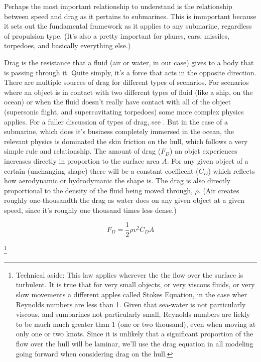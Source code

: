 \documentclass{article}\usepackage[]{graphicx}\usepackage[]{color}
\begin{document}
Perhaps the most important relationship to understand is the relationship between speed and drag as it pertains to submarines.  This is immportant because it sets out the fundamental framework as it applies to any submarine, regardless of propulsion type.  (It's also a pretty important for planes, cars, missiles, torpedoes, and basically everything else.)

Drag is the resistance that a fluid (air or water, in our case) gives to a body that is passing through it. Quite simply, it's a force that acts in the opposite direction.  There are multiple sources of drag for different types of scenarios.  For scenarios where an object is in contact with two different types of fluid (like a ship, on the ocean) or when the fluid doesn't really have contact with all of the object (supersonic flight, and supercavitating torpedoes) some more complex physics applies. For a fuller discussion of types of drag, see \parencite{carlton2007}. But in the case of a submarine, which does it's business completely immersed in the ocean, the relevant physics is dominated the skin friction on the hull, which follows a very simple rule and relationship.  The amount of drag ($F_D$) an objet experiences increases directly in proportion to the surface area $A$.  For any given object of a certain (unchanging shape) there will be a constant coefficent ($C_D$) which reflects how aerodynamic or hydrodymanic the shape is.  The drag is also directly proportional to the density of the fluid being moved through, $\rho$.  (Air creates roughly one-thousandth the drag as water does on any given object at a given speed, since it's roughly one thousand times less dense.)


\begin{equation} 
\label{eq:1}
F_D = \frac{1}{2}\rho v^2C_DA
\end{equation}

\footnote{Technical aside: This law applies wherever the the flow over the surface is turbulent. It is true that for very small objects, or very viscous fluids, or very slow movements a different apples called Stokes Equation, in the case wher Reynolds numbers are less than 1.  Given that sea-water is not particularly viscous, and sumbarines not particularly small, Reynolds numbers are liekly to be much much greater than 1 (one or two thousand), even when moving at only one or two knots.  Since it is unlikely that a significant proportion of the flow over the hull will be laminar, we'll use the drag equation in all modeling going forward when considering drag on the hull.}
\end{document}
